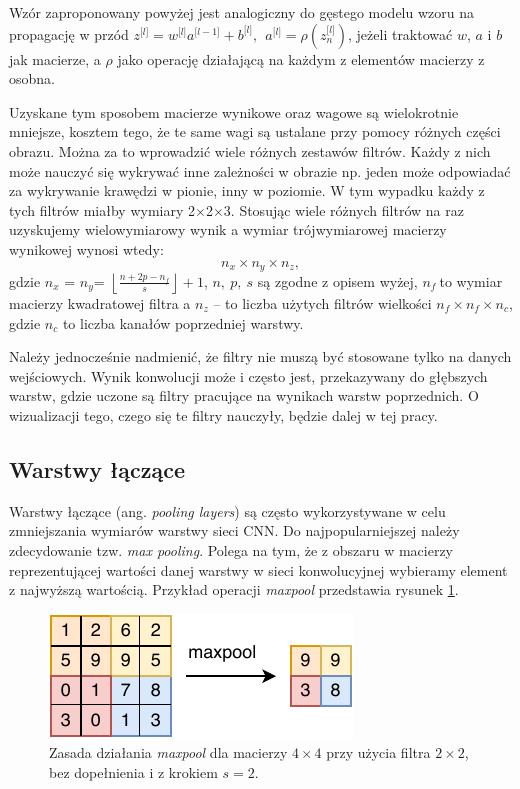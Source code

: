Wzór zaproponowany powyżej jest analogiczny do gęstego modelu wzoru na
propagację w przód \(z^{\lbrack l\rbrack} = w^{\lbrack l\rbrack}a^{\lbrack l - 1\rbrack} + b^{\lbrack l\rbrack},\ \ a^{\lbrack l\rbrack} = \rho(z_{n}^{\lbrack l\rbrack})\), jeżeli traktować \(w\), \(a\) i \(b\) jak macierze, a \(\rho\) jako operację działającą na każdym z elementów macierzy z osobna.

Uzyskane tym sposobem macierze wynikowe oraz wagowe są wielokrotnie mniejsze, kosztem tego, że te same wagi są ustalane przy pomocy różnych części obrazu. Można za to wprowadzić wiele różnych zestawów filtrów. Każdy z nich może nauczyć się wykrywać inne zależności w obrazie np. jeden może odpowiadać za wykrywanie krawędzi w pionie, inny w poziomie. W tym wypadku każdy z tych filtrów miałby wymiary 2\(\times\)2\(\times\)3. Stosując wiele różnych filtrów na raz uzyskujemy wielowymiarowy wynik
a wymiar trójwymiarowej macierzy wynikowej wynosi wtedy:
\[n_{x} \times n_{y} \times n_{z}, \tag{10}\]
gdzie \(n_{x}\) = ­­\(n_{y}\)=
\(\left\lfloor \frac{n + 2p - n_{f}}{s} \right\rfloor + 1\), \(n,\ p,\ s\)
są zgodne z opisem wyżej, \(n_{f}\ \)to wymiar macierzy kwadratowej
filtra a \(n_{z}\) -- to liczba użytych filtrów wielkości
\(n_{f} \times n_{f} \times n_{c}\), gdzie \(n_{c}\) to liczba kanałów poprzedniej warstwy.

Należy jednocześnie nadmienić, że filtry nie muszą być stosowane tylko na danych wejściowych. Wynik konwolucji może i często jest, przekazywany do głębszych warstw, gdzie uczone są filtry pracujące na wynikach warstw poprzednich. O wizualizacji tego, czego się te filtry nauczyły, będzie dalej w tej pracy.

\subsection{Warstwy łączące}

Warstwy łączące (ang. \textit{pooling layers}) są często wykorzystywane w celu zmniejszania wymiarów warstwy sieci CNN. Do najpopularniejszej należy zdecydowanie tzw. \textit{max pooling}. Polega na tym, że z obszaru w macierzy reprezentującej wartości danej warstwy w sieci konwolucyjnej wybieramy element z najwyższą wartością. Przykład operacji \textit{maxpool} przedstawia rysunek \ref{fig:maxpool}.

\begin{figure}[ht]
\centerline{\includegraphics[scale=1]{resources/cnn/maxpool.pdf}}
\caption{Zasada działania \textit{maxpool} dla macierzy \(4 \times 4\) przy użycia filtra \(2 \times 2\), bez dopełnienia i z krokiem \(s = 2\).}
\label{fig:maxpool}
\end{figure}

